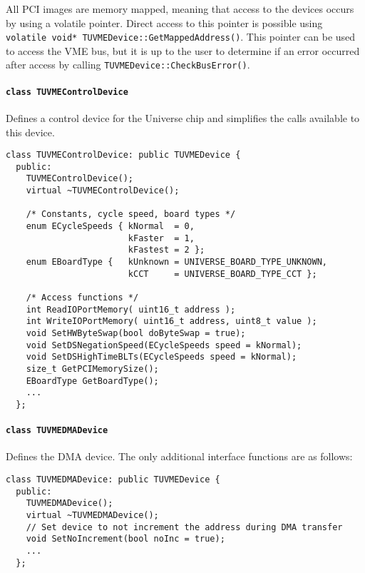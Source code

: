 All PCI images are memory mapped, meaning that access to the devices occurs by
using a volatile pointer.  Direct access to this pointer is possible using 
\lstinline!volatile void* TUVMEDevice::GetMappedAddress()!.  This pointer
can be used to access the VME bus, but it is up to the user to determine
if an error occurred after access by calling \lstinline!TUVMEDevice::CheckBusError()!.
				\paragraph{\lstinline!class TUVMEControlDevice!}
Defines a control device for the Universe chip and simplifies the calls
available to this device. 
					\begin{lstlisting}
class TUVMEControlDevice: public TUVMEDevice {
  public:
    TUVMEControlDevice();
    virtual ~TUVMEControlDevice();

    /* Constants, cycle speed, board types */
    enum ECycleSpeeds { kNormal  = 0,
                        kFaster  = 1,
                        kFastest = 2 };
    enum EBoardType { 	kUnknown = UNIVERSE_BOARD_TYPE_UNKNOWN,
	              		kCCT     = UNIVERSE_BOARD_TYPE_CCT }; 
    
    /* Access functions */
    int ReadIOPortMemory( uint16_t address );
    int WriteIOPortMemory( uint16_t address, uint8_t value );
    void SetHWByteSwap(bool doByteSwap = true);
    void SetDSNegationSpeed(ECycleSpeeds speed = kNormal);
    void SetDSHighTimeBLTs(ECycleSpeeds speed = kNormal);
    size_t GetPCIMemorySize();
    EBoardType GetBoardType();
    ...
  };
					\end{lstlisting}
				\paragraph{\lstinline!class TUVMEDMADevice!}
Defines the DMA device.  The only additional interface functions are as follows:
					\begin{lstlisting}
class TUVMEDMADevice: public TUVMEDevice {
  public:
    TUVMEDMADevice();
    virtual ~TUVMEDMADevice();
    // Set device to not increment the address during DMA transfer
    void SetNoIncrement(bool noInc = true); 
	...
  };
					\end{lstlisting}
